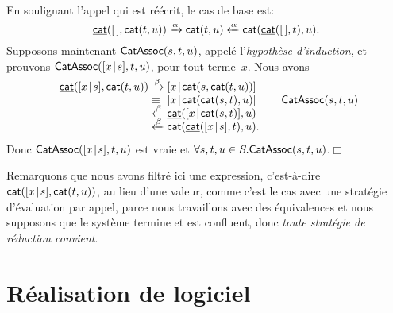 \noindent En soulignant l'appel qui est réécrit, le cas de base
est:
\begin{equation*} \ufun{cat}(\el,\fun{cat}(t,u))
  \xrightarrow{\smash{\alpha}} \fun{cat}(t,u)
  \xleftarrow{\smash{\alpha}} \fun{cat}(\ufun{cat}(\el,t),u).
  \index{cat@\fun{cat/2}}
\end{equation*}
Supposons maintenant \(\textsf{CatAssoc}({s,t,u})\), appelé
l'\emph{hypothèse d'induction}, et
prouvons
\(\textsf{CatAssoc}({[{x}\!\mid\!{s}],t,u})\),
pour tout terme~\(x\). Nous avons
\begin{equation*}
\begin{array}{r@{\;}l@{\;}l@{\qquad}r@{}}
  \ufun{cat}(\cons{x}{s},\fun{cat}(t,u))
& \xrightarrow{\smash\beta}
& \cons{x}{\fun{cat}(s,\fun{cat}(t,u))}\\
& \equiv
& \cons{x}{\fun{cat}(\fun{cat}(s,t),u)}
& \IH{\pred{CatAssoc}{s,t,u}}\\
& \xleftarrow{\smash\beta}
& \ufun{cat}(\cons{x}{\fun{cat}(s,t)},u)\\
& \xleftarrow{\smash\beta}
& \fun{cat}(\ufun{cat}(\cons{x}{s},t),u).\index{cat@\fun{cat/2}}
\end{array}
\end{equation*}
Donc
\(\textsf{CatAssoc}({[{x}\!\mid\!{s}],t,u})\) est vraie et \(\forall s,t,u \in
S.\textsf{CatAssoc}({s,t,u})\).\hfill\(\Box\)

Remarquons que nous avons filtré ici une expression, c'est-à-dire
\(\textsf{cat}([{x}\!\mid\!{s}],\textsf{cat}(t,u))\), au lieu d'une valeur, comme
c'est le cas avec une stratégie d'évaluation par appel, parce nous
travaillons avec des équivalences et nous supposons que le système
termine et est confluent, donc \emph{toute stratégie de réduction
convient}.

\section{Réalisation de logiciel}
\label{sec:implementation}


